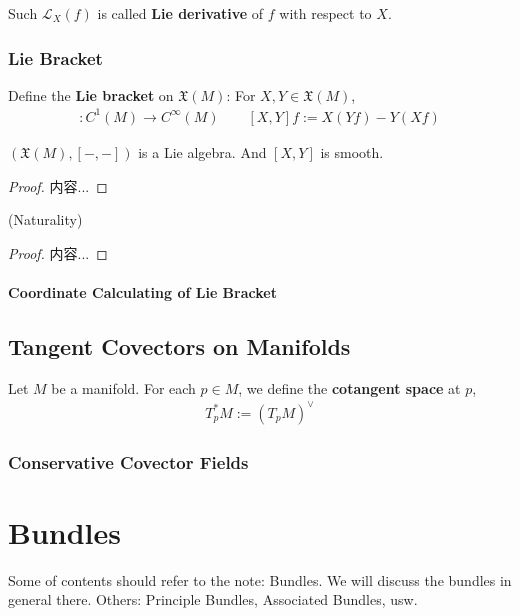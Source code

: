\documentclass[Total.tex]{subfiles}
\begin{document}
			\begin{Def}
				Such $\mathcal{L}_X(f)$ is called \textbf{Lie derivative} of $f$ with respect to $X$.
			\end{Def}
			\subsection{Lie Bracket}
			\begin{Def}
				Define the \textbf{Lie bracket} on $\mathfrak{X}(M)$: For $X,Y\in \mathfrak{X}(M)$, 
				\begin{gather*}
					[X,Y]:C^1(M)\rightarrow C^\infty(M)\qquad [X,Y]f:=X(Yf)-Y(Xf)
				\end{gather*}
			\end{Def}
			\begin{proposition}
				$(\mathfrak{X}(M),[-,-])$ is a Lie algebra. And $[X,Y]$ is smooth.
			\end{proposition}
			\begin{proof}
				内容...
			\end{proof}
			
			\begin{proposition}
				(Naturality)
			\end{proposition}
			\begin{proof}
				内容...
			\end{proof}
			\subsubsection{Coordinate Calculating of Lie Bracket}
			
		\section{Tangent Covectors on Manifolds}
			\begin{Def}
				Let $M$ be a manifold. For each $p\in M$, we define the \textbf{cotangent space} at $p$, 
				\begin{gather*}
					T_p^*M:=(T_p M)^\vee
				\end{gather*}
			\end{Def}
			\subsection{Conservative Covector Fields}
	\chapter{Bundles}
		Some of contents should refer to the note: Bundles. We will discuss the bundles in general there. Others: Principle Bundles, Associated Bundles, usw. 
\end{document}

